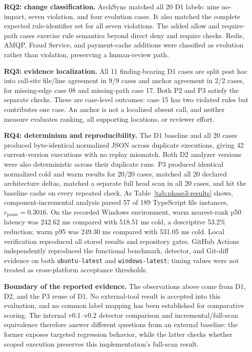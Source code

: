 \documentclass[conference]{IEEEtran}
\begin{document}
\textbf{RQ2: change classification.}
ArchSync matched all 20 D1 labels: nine no-impact, seven violation, and four evolution cases. It also matched the complete expected rule-identifier set for all seven violations. The added allow and require-path cases exercise rule semantics beyond direct deny and require checks. Redis, AMQP, Fraud Service, and payment-cache additions were classified as evolution rather than violation, preserving a human-review path.

\textbf{RQ3: evidence localization.}
All 11 finding-bearing D1 cases are split post hoc into call-site file/line agreement in 9/9 cases and anchor agreement in 2/2 cases, for missing-edge case 08 and missing-path case 17. Both P2 and P3 satisfy the separate checks. These are case-level outcomes: case 15 has two violated rules but contributes one case. An anchor is not a localized absent call, and neither measure evaluates ranking, all supporting locations, or reviewer effort.

\textbf{RQ4: determinism and reproducibility.}
The D1 baseline and all 20 cases produced byte-identical normalized JSON across duplicate executions, giving 42 current-version executions with no replay mismatch. Both D2 analyzer versions were also deterministic across their duplicate runs. P3 produced identical normalized cold and warm results for 20/20 cases, matched all 20 declared architecture deltas, matched a separate full head scan in all 20 cases, and hit the baseline cache on every repeated check. As Table~\ref{tab:phase3-results} shows, component-incremental analysis parsed 57 of 189 TypeScript file instances, $r_{\mathrm{parse}}=0.3016$. On the recorded Windows environment, warm nearest-rank p50 latency was 242.62 ms compared with 518.51 ms cold, a descriptive 53.2\% reduction; warm p95 was 249.30 ms compared with 531.05 ms cold. Local verification reproduced all stored results and repository gates. GitHub Actions independently reproduced the functional benchmark, detector, and Git-diff evidence on both \texttt{ubuntu-latest} and \texttt{windows-latest}; timing values were not treated as cross-platform acceptance thresholds.

\textbf{Boundary of the reported evidence.}
The observations above come from D1, D2, and the P3 reuse of D1. No external-tool result is accepted into this evaluation, and no common label mapping has been established for comparative scoring. The internal v0.1--v0.2 detector comparison and incremental/full-scan equivalence therefore answer different questions from an external baseline: the former exposes targeted regression behavior, while the latter checks whether scoped execution preserves this implementation's full-scan result.
\end{document}
